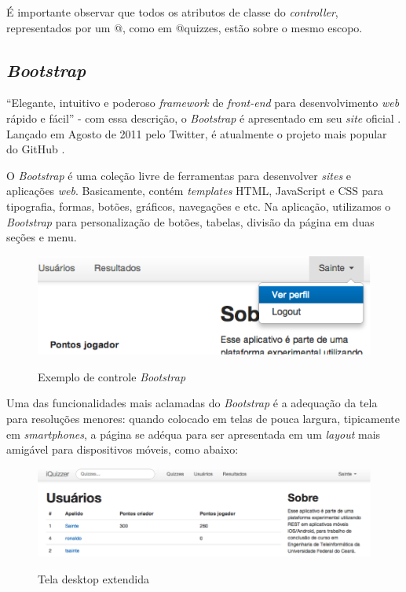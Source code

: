             É importante observar que todos os atributos de classe do \emph{controller}, representados por um @, como em @quizzes, estão sobre o mesmo escopo.
			
    \subsection{\emph{Bootstrap}}
            ``Elegante, intuitivo e poderoso \emph{framework} de \emph{front-end} para desenvolvimento \emph{web} rápido e fácil'' - com essa descrição, o \emph{Bootstrap} é apresentado em seu \emph{site} oficial \cite{bootstrap}.  Lançado em Agosto de 2011 pelo Twitter, é atualmente o projeto mais popular do GitHub \cite{githubpop}.
			
            O \emph{Bootstrap} é uma coleção livre de ferramentas para desenvolver \emph{sites} e aplicações \emph{web}. Basicamente, contém \emph{templates} \ac{HTML}, JavaScript e \ac{CSS} para tipografia, formas, botões, gráficos, navegações e etc.
    Na aplicação, utilizamos o \emph{Bootstrap} para personalização de botões, tabelas, divisão da página em duas seções e menu.
	 \begin{figure}[H]
	   \centering
	   \includegraphics{figs/bootstrapcontrol.png}\\
	   \caption{ Exemplo de controle \emph{Bootstrap} }
	   \label{FIG:bootstrapcontrol}
	 \end{figure}
     
            Uma das funcionalidades mais aclamadas do \emph{Bootstrap} é a adequação da tela para resoluções menores: quando colocado em telas de pouca largura, tipicamente em \emph{smartphones}, a página se adéqua para ser apresentada em um \emph{layout} mais amigável para dispositivos móveis, como abaixo:
	 \begin{figure}[H]
	   \centering
	   \includegraphics{figs/bootstraplayout1.png}\\
	   \caption{ Tela desktop extendida}
	   \label{FIG:bootstrapcontrol}
	 \end{figure}
	 
